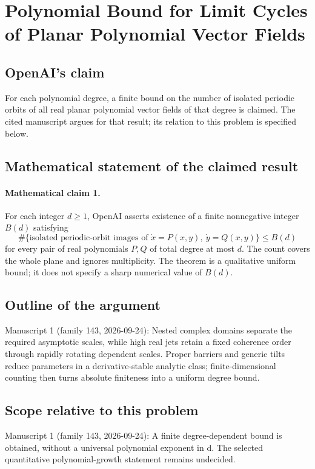 \documentclass[11pt]{article}
\begin{document}
\section*{Polynomial Bound for Limit Cycles of Planar Polynomial Vector Fields}

\subsection{OpenAI's claim}
For each polynomial degree, a finite bound on the number of isolated periodic orbits of all real planar polynomial vector fields of that degree is claimed. The cited manuscript argues for that result; its relation to this problem is specified below.

\subsection{Mathematical statement of the claimed result}
\paragraph{Mathematical claim 1.} For each integer $d\ge1$, OpenAI asserts existence of a finite nonnegative integer $B(d)$ satisfying
\[
\#\{\text{isolated periodic-orbit images of }\dot x=P(x,y),\ \dot y=Q(x,y)\}\le B(d)
\]
for every pair of real polynomials $P,Q$ of total degree at most $d$. The count covers the whole plane and ignores multiplicity. The theorem is a qualitative uniform bound; it does not specify a sharp numerical value of $B(d)$.

\subsection{Outline of the argument}
Manuscript 1 (family 143, 2026-09-24): Nested complex domains separate the required asymptotic scales, while high real jets retain a fixed coherence order through rapidly rotating dependent scales. Proper barriers and generic tilts reduce parameters in a derivative-stable analytic class; finite-dimensional counting then turns absolute finiteness into a uniform degree bound.

\subsection{Scope relative to this problem}
Manuscript 1 (family 143, 2026-09-24): A finite degree-dependent bound is obtained, without a universal polynomial exponent in d. The selected quantitative polynomial-growth statement remains undecided.
\end{document}
